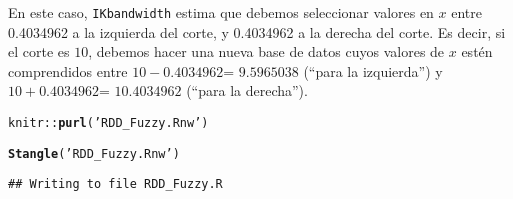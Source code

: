 \documentclass[onesided]{article}\usepackage[]{graphicx}\usepackage[]{color}
\makeatletter
\newcommand{\hlstr}[1]{\textcolor[rgb]{0.192,0.494,0.8}{#1}}%
\newcommand{\hlopt}[1]{\textcolor[rgb]{0,0,0}{#1}}%
\newcommand{\hlstd}[1]{\textcolor[rgb]{0.345,0.345,0.345}{#1}}%
\newcommand{\hlkwd}[1]{\textcolor[rgb]{0.737,0.353,0.396}{\textbf{#1}}}%
\newenvironment{kframe}{%
 \def\at@end@of@kframe{}%
 \ifinner\ifhmode%
  \def\at@end@of@kframe{\end{minipage}}%
  \begin{minipage}{\columnwidth}%
 \fi\fi%
 \def\FrameCommand##1{\hskip\@totalleftmargin \hskip-\fboxsep
 \colorbox{shadecolor}{##1}\hskip-\fboxsep
     \hskip-\linewidth \hskip-\@totalleftmargin \hskip\columnwidth}%
 \MakeFramed {\advance\hsize-\width
   \@totalleftmargin\z@ \linewidth\hsize
   \@setminipage}}%
 {\par\unskip\endMakeFramed%
 \at@end@of@kframe}
\newenvironment{knitrout}{}{} %
\makeatother
\begin{document}
En este caso, \texttt{IKbandwidth} estima que debemos seleccionar valores en $x$ entre 0.4034962 a la izquierda del corte, y 0.4034962 a la derecha del corte. Es decir, si el corte es $10$, debemos hacer una nueva base de datos cuyos valores de $x$ est\'en comprendidos entre $10-0.4034962$= $9.5965038$ (``para la izquierda'') y $10+0.4034962$= $10.4034962$ (``para la derecha'').


\begin{knitrout}
\color{fgcolor}\begin{kframe}
\begin{alltt}
\hlstd{knitr}\hlopt{::}\hlkwd{purl}\hlstd{(}\hlstr{'RDD_Fuzzy.Rnw'}\hlstd{)}
\end{alltt}


{\ttfamily\noindent\bfseries{}}\begin{alltt}
\hlkwd{Stangle}\hlstd{(}\hlstr{'RDD_Fuzzy.Rnw'}\hlstd{)}
\end{alltt}
\begin{verbatim}
## Writing to file RDD_Fuzzy.R
\end{verbatim}
\end{kframe}
\end{knitrout}

\paragraph{}
\paragraph{}
\setcounter{page}{1}
\printbibliography
\end{document}
